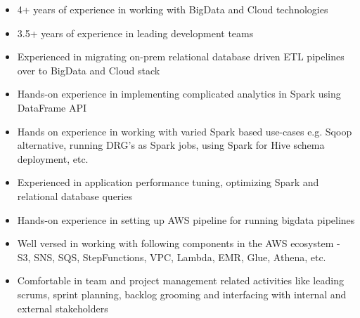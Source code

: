 %
%
%

{
\vspace{1em}
\begin{itemize}
	\item 4+ years of experience in working with BigData and Cloud technologies
	\item 3.5+ years of experience in leading development teams
	\item Experienced in migrating on-prem relational database driven ETL pipelines over to BigData and Cloud stack
	\item Hands-on experience in implementing complicated analytics in Spark using DataFrame API
	\item Hands on experience in working with varied Spark based use-cases e.g. Sqoop alternative, running DRG's as Spark jobs, using Spark for Hive schema deployment, etc.
	\item Experienced in application performance tuning, optimizing Spark and relational database queries
	\item Hands-on experience in setting up AWS pipeline for running bigdata pipelines
	\item Well versed in working with following components in the AWS ecosystem - S3, SNS, SQS, StepFunctions, VPC, Lambda, EMR, Glue, Athena, etc.
	\item Comfortable in team and project management related activities like leading scrums, sprint planning, backlog grooming and interfacing with internal and external stakeholders\\
\end{itemize}
}

